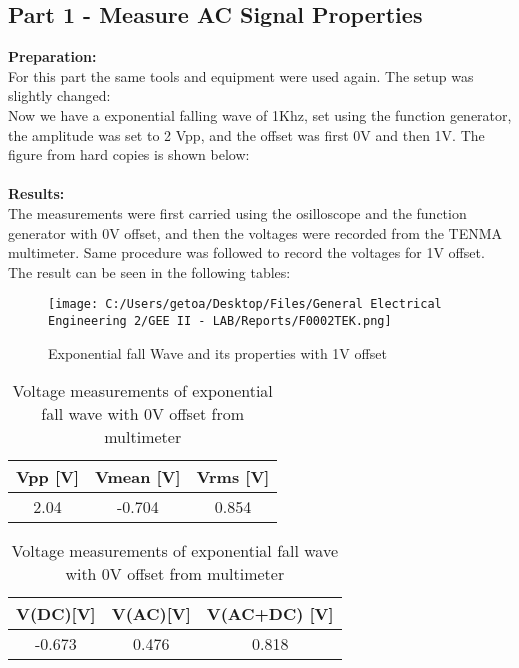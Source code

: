 \documentclass[12pt]{report}
\begin{document}
\subsection{Part 1 - Measure AC Signal Properties}
\textbf{Preparation:} \\
For this part the same tools and equipment were used again. The setup was slightly changed:\\
Now we have a exponential falling wave of 1Khz, set using the function generator, the amplitude was set to 2 Vpp, and the offset was first 0V and then 1V. The figure from hard copies is shown below:\\
\\
\textbf{Results:} \\
The measurements were first carried using the osilloscope and the function generator with 0V offset, and then the voltages were recorded from the TENMA multimeter. Same procedure was followed to record the voltages for 1V offset. The result can be seen in the following tables:
\begin{figure}[ht]
  \centering
  \texttt{[image: C:/Users/getoa/Desktop/Files/General Electrical Engineering 2/GEE II - LAB/Reports/F0002TEK.png]}
  \caption{Exponential fall Wave and its properties with 1V offset}
\end{figure} 
\begin{table}[!ht]
\centering
\begin{minipage}{0.8\linewidth}
\centering
\begin{tabular}{|c|c|c|}
\hline
\rowcolor{lightblue} Vpp [V] & Vmean [V] & Vrms [V] \\
\hline
2.04 & -0.704 & 0.854 \\
\hline
\end{tabular}
\caption{Voltage measurements of exponential fall wave with 0V offset from oscilloscope\\}
\label{tab:voltage1} 
\end{minipage}
\hfill
\begin{minipage}{0.8\linewidth}
\centering
\begin{tabular}{|c|c|c|}
\hline
\rowcolor{lightblue} V(DC)[V] & V(AC)[V] & V(AC+DC) [V] \\
\hline
-0.673 & 0.476 & 0.818 \\
\hline
\end{tabular}
\caption{Voltage measurements of exponential fall wave with 0V offset from multimeter}
\label{tab:voltage2a}
\end{minipage}
\end{table}
\end{document}
